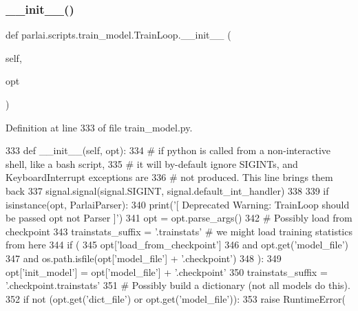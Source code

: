\subsubsection{\texorpdfstring{\+\_\+\+\_\+init\+\_\+\+\_\+()}{\_\_init\_\_()}}
{\footnotesize\ttfamily def parlai.\+scripts.\+train\+\_\+model.\+Train\+Loop.\+\_\+\+\_\+init\+\_\+\+\_\+ (\begin{DoxyParamCaption}\item[{}]{self,  }\item[{}]{opt }\end{DoxyParamCaption})}



Definition at line 333 of file train\+\_\+model.\+py.


\begin{DoxyCode}
333     \textcolor{keyword}{def }\_\_init\_\_(self, opt):
334         \textcolor{comment}{# if python is called from a non-interactive shell, like a bash script,}
335         \textcolor{comment}{# it will by-default ignore SIGINTs, and KeyboardInterrupt exceptions are}
336         \textcolor{comment}{# not produced. This line brings them back}
337         signal.signal(signal.SIGINT, signal.default\_int\_handler)
338 
339         \textcolor{keywordflow}{if} isinstance(opt, ParlaiParser):
340             print(\textcolor{stringliteral}{'[ Deprecated Warning: TrainLoop should be passed opt not Parser ]'})
341             opt = opt.parse\_args()
342         \textcolor{comment}{# Possibly load from checkpoint}
343         trainstats\_suffix = \textcolor{stringliteral}{'.trainstats'}  \textcolor{comment}{# we might load training statistics from here}
344         \textcolor{keywordflow}{if} (
345             opt[\textcolor{stringliteral}{'load\_from\_checkpoint'}]
346             \textcolor{keywordflow}{and} opt.get(\textcolor{stringliteral}{'model\_file'})
347             \textcolor{keywordflow}{and} os.path.isfile(opt[\textcolor{stringliteral}{'model\_file'}] + \textcolor{stringliteral}{'.checkpoint'})
348         ):
349             opt[\textcolor{stringliteral}{'init\_model'}] = opt[\textcolor{stringliteral}{'model\_file'}] + \textcolor{stringliteral}{'.checkpoint'}
350             trainstats\_suffix = \textcolor{stringliteral}{'.checkpoint.trainstats'}
351         \textcolor{comment}{# Possibly build a dictionary (not all models do this).}
352         \textcolor{keywordflow}{if} \textcolor{keywordflow}{not} (opt.get(\textcolor{stringliteral}{'dict\_file'}) \textcolor{keywordflow}{or} opt.get(\textcolor{stringliteral}{'model\_file'})):
353             \textcolor{keywordflow}{raise} RuntimeError(

\end{DoxyCode}
